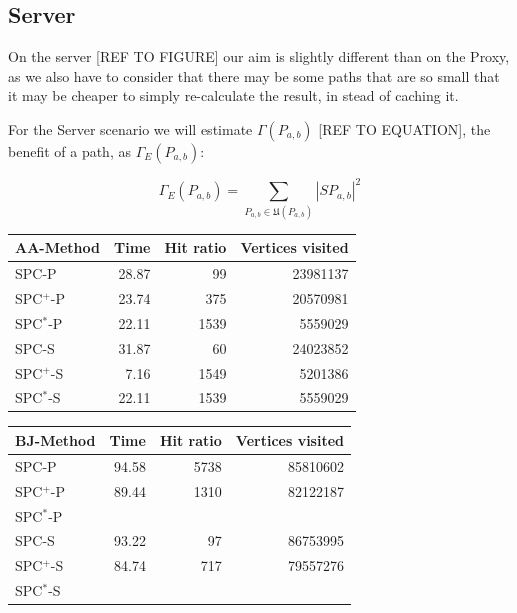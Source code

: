 \subsection{Server}\label{subsec:expServer}

On the server [REF TO FIGURE] our aim is slightly different than on the Proxy, as we also have to consider that there may be some paths that are so small that it may be cheaper to simply re-calculate the result, in stead of caching it.

For the Server scenario we will estimate 
$\Gamma(P_{a,b})$ 
[REF TO EQUATION], the benefit of a path, as 
$\Gamma_E(P_{a,b})$:


\begin{equation} \label{eq:estimateCost}
\Gamma{_E} (P_{a,b})  =\sum\limits_{P_{a,b} \in \mathfrak{U}(P_{a,b})} |SP_{a,b}|^2
\end{equation}

% 



\begin{tabular}{|l|r|r|r|}\hline
AA-Method & Time & Hit ratio & Vertices visited \\\hline
SPC-P & 28.87 & 99 & 23981137 \\\hline
SPC$^+$-P & 23.74 & 375 & 20570981 \\\hline
SPC$^*$-P & 22.11 & 1539 & 5559029\\\hline
SPC-S & 31.87 & 60 & 24023852 \\\hline
SPC$^+$-S & 7.16 & 1549 & 5201386 \\\hline 
SPC$^*$-S & 22.11 & 1539 & 5559029 \\\hline
\end{tabular}



\begin{tabular}{|l|r|r|r|}\hline
BJ-Method & Time & Hit ratio & Vertices visited \\\hline
SPC-P & 94.58 & 5738 & 85810602\\\hline
SPC$^+$-P & 89.44 & 1310 & 82122187 \\\hline
SPC$^*$-P & &  &  \\\hline
SPC-S & 93.22 & 97 & 86753995 \\\hline
SPC$^+$-S & 84.74 & 717 & 79557276 \\\hline 
SPC$^*$-S &  &  &  \\\hline
\end{tabular}





